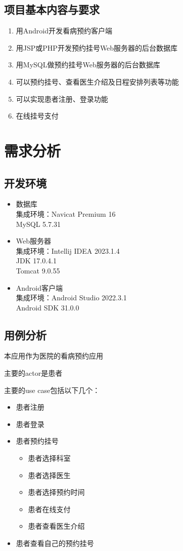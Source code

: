 \documentclass[UTF8,12pt]{article}
\begin{document}
\subsection{项目基本内容与要求}
\begin{enumerate}
    \item 用Android开发看病预约客户端
    \item 用JSP或PHP开发预约挂号Web服务器的后台数据库
    \item 用MySQL做预约挂号Web服务器的后台数据库
    \item 可以预约挂号、查看医生介绍及日程安排列表等功能
    \item 可以实现患者注册、登录功能
    \item 在线挂号支付
\end{enumerate}

\newpage

\section{需求分析}
\subsection{开发环境}
\begin{itemize}
    \item 数据库
    \\集成环境：Navicat Premium 16
    \\MySQL 5.7.31
    \item Web服务器
    \\集成环境：Intellij IDEA 2023.1.4
    \\JDK 17.0.4.1
    \\Tomcat 9.0.55
    \item Android客户端
    \\集成环境：Android Studio 2022.3.1
    \\Android SDK 31.0.0
\end{itemize}

\subsection{用例分析}
本应用作为医院的看病预约应用

主要的actor是患者


主要的use case包括以下几个：
\begin{itemize}
    \item 患者注册
    \item 患者登录
    \item 患者预约挂号
    \begin{itemize}
        \item 患者选择科室
        \item 患者选择医生
        \item 患者选择预约时间
        \item 患者在线支付
        \item 患者查看医生介绍
    \end{itemize}
    \item 患者查看自己的预约挂号
\end{itemize}
\end{document}
